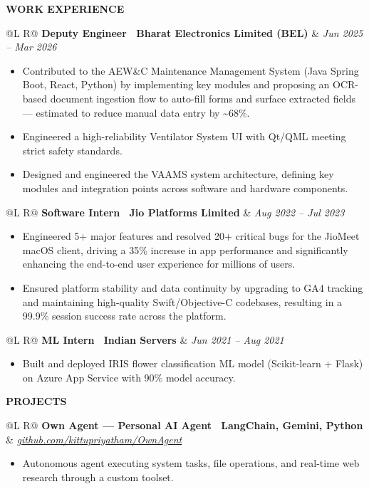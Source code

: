 \documentclass[10pt,a4paper]{article}
\makeatletter
\newcommand{\sectionrule}{\par\vspace{3pt}{\color{Accent}\hrule height 1pt}\vspace{3pt}}
\newcommand{\Section}[1]{%
  {\sectionrule \color{Accent}\bfseries\uppercase{#1}}\par\sectionrule
}
\newcommand{\WorkEntry}[3]{%
  \begin{tabularx}{\linewidth}{@{}L R@{}}
    {\bfseries #1 \textbar\  #2} & {\footnotesize\itshape\sloppy #3}\\
  \end{tabularx}
}
\makeatother
\begin{document}
\vspace{4pt}

\Section{Work Experience}

\WorkEntry{Deputy Engineer}{Bharat Electronics Limited (BEL)}{Jun 2025 -- Mar 2026}
\begin{itemize}
  \item Contributed to the AEW\&C Maintenance Management System (Java Spring Boot, React, Python) by implementing key modules and proposing an OCR-based document ingestion flow to auto-fill forms and surface extracted fields --- estimated to reduce manual data entry by \textasciitilde{}68\%.
  \item Engineered a high-reliability Ventilator System UI with Qt/QML meeting strict safety standards.
  \item Designed and engineered the VAAMS system architecture, defining key modules and integration points across software and hardware components.
\end{itemize}

\WorkEntry{Software Intern}{Jio Platforms Limited}{Aug 2022 -- Jul 2023}
\begin{itemize}
  \item Engineered 5+ major features and resolved 20+ critical bugs for the JioMeet macOS client, driving a 35\% increase in app performance and significantly enhancing the end-to-end user experience for millions of users.
  \item Ensured platform stability and data continuity by upgrading to GA4 tracking and maintaining high-quality Swift/Objective-C codebases, resulting in a 99.9\% session success rate across the platform.
\end{itemize}

\WorkEntry{ML Intern}{Indian Servers}{Jun 2021 -- Aug 2021}
\begin{itemize}
  \item Built and deployed IRIS flower classification ML model (Scikit-learn + Flask) on Azure App Service with 90\% model accuracy.
\end{itemize}

\vspace{2pt}

\Section{Projects}

\WorkEntry{Own Agent --- Personal AI Agent}{LangChain, Gemini, Python}{\href{https://github.com/kittupriyatham/OwnAgent}{github.com/kittupriyatham/OwnAgent}}
\begin{itemize}
  \item Autonomous agent executing system tasks, file operations, and real-time web research through a custom toolset.
\end{itemize}
\end{document}
